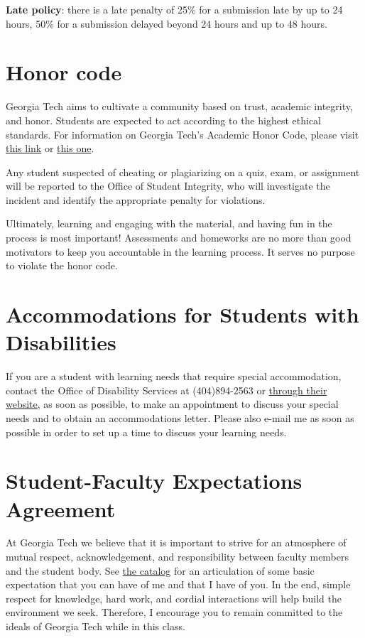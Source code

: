 \documentclass[12pt]{article}
\begin{document}
\textbf{Late policy}: there is a late penalty of 25\% for a submission late by up to 24 hours, 50\% for a submission delayed beyond 24 hours and up to 48 hours. 

\section{Honor code}
\label{sec:honor}

Georgia Tech aims to cultivate a community based on trust, academic integrity, and honor. Students are expected to act according to the highest ethical standards.  For information on Georgia Tech's Academic Honor Code, please visit \href{http://www.catalog.gatech.edu/policies/honor-code/}{this link} or \href{http://www.catalog.gatech.edu/rules/18/}{this one}. 

Any student suspected of cheating or plagiarizing on a quiz, exam, or assignment will be reported to the Office of Student Integrity, who will investigate the incident and identify the appropriate penalty for violations.

Ultimately, learning and engaging with the material, and having fun in the process is most important! Assessments and homeworks are no more than good motivators to keep you accountable in the learning process. It serves no purpose to violate the honor code. 

\section{Accommodations for Students with Disabilities} 

If you are a student with learning needs that require special accommodation, contact the Office of Disability Services at (404)894-2563 or \href{http://disabilityservices.gatech.edu/}{through their website}, as soon as possible, to make an appointment to discuss your special needs and to obtain an accommodations letter.  Please also e-mail me as soon as possible in order to set up a time to discuss your learning needs. 

\section{Student-Faculty Expectations Agreement} 

At Georgia Tech we believe that it is important to strive for an atmosphere of mutual respect, acknowledgement, and responsibility between faculty members and the student body. See \href{http://www.catalog.gatech.edu/rules/22/}{the catalog} for an articulation of some basic expectation that you can have of me and that I have of you. In the end, simple respect for knowledge, hard work, and cordial interactions will help build the environment we seek. Therefore, I encourage you to remain committed to the ideals of Georgia Tech while in this class. 


\end{document}
